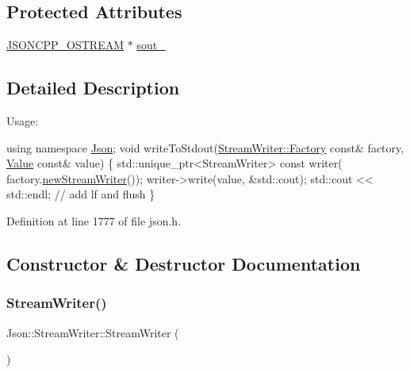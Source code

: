 \subsection*{Protected Attributes}
\begin{DoxyCompactItemize}
\item 
\hyperlink{config_8h_a37a25be5fca174927780caeb280094ce}{J\+S\+O\+N\+C\+P\+P\+\_\+\+O\+S\+T\+R\+E\+AM} $\ast$ \hyperlink{class_json_1_1_stream_writer_a479189c5615f3cf1b34cd2b716eea88d}{sout\+\_\+}
\end{DoxyCompactItemize}


\subsection{Detailed Description}
Usage\+: 
\begin{DoxyCode}
\textcolor{keyword}{using namespace }\hyperlink{namespace_json}{Json};
\textcolor{keywordtype}{void} writeToStdout(\hyperlink{class_json_1_1_stream_writer_1_1_factory}{StreamWriter::Factory} \textcolor{keyword}{const}& factory, 
      \hyperlink{class_json_1_1_value}{Value} \textcolor{keyword}{const}& value) \{
  std::unique\_ptr<StreamWriter> \textcolor{keyword}{const} writer(
    factory.\hyperlink{class_json_1_1_stream_writer_1_1_factory_a9d30ec53e8288cd53befccf1009c5f31}{newStreamWriter}());
  writer->write(value, &std::cout);
  std::cout << std::endl;  \textcolor{comment}{// add lf and flush}
\}
\end{DoxyCode}
 

Definition at line 1777 of file json.\+h.



\subsection{Constructor \& Destructor Documentation}
\hypertarget{class_json_1_1_stream_writer_a66e6f5113618ce6b04cac9b3c85a3707}{}\label{class_json_1_1_stream_writer_a66e6f5113618ce6b04cac9b3c85a3707} 
\subsubsection{\texorpdfstring{Stream\+Writer()}{StreamWriter()}\hspace{0.1cm}{\footnotesize\ttfamily [1/2]}}
{\footnotesize\ttfamily Json\+::\+Stream\+Writer\+::\+Stream\+Writer (\begin{DoxyParamCaption}{ }\end{DoxyParamCaption})}



